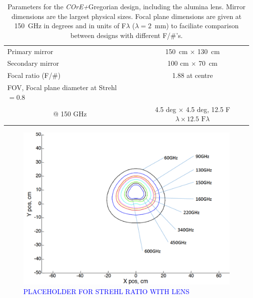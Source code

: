 \documentclass[11pt,a4paper]{article}
\newcommand{\comblue}[1]{\textcolor{blue}{#1}}
\newcommand{\coreplus}{\textit{\negthinspace COrE+\/}}
\begin{document}
\begin{table}[h!]
	\centering
	\begin{tabular}{|l|c|}
		\hline
		Primary mirror   & 150~cm $\times$ 130~cm   \\
		Secondary mirror   & 100 cm $\times$ 70~cm  \\
		Focal ratio (F/\#)               & 1.88 at centre   \\
		\multicolumn{1}{|l|}{FOV, Focal plane diameter at Strehl $= 0.8$} & \\
		\multicolumn{1}{|c|}{@ 150 GHz}    & 4.5 deg $\times$ 4.5 deg, 12.5 F$\lambda \times 12.5 \text{~F}\lambda$ \\
		\hline
		
	\end{tabular}
	\caption{Parameters for the \coreplus Gregorian design, including the alumina lens.  Mirror dimensions are the largest physical sizes.  Focal plane dimensions are given at 150~GHz in degrees and in units of F$\lambda$ ($\lambda=2$~mm) to faciliate comparison between 
		designs with different F/\#'s. }
	\label{tab:mirrors_greg}
	
\end{table}
\begin{figure}[htbp]
	\centering
	\includegraphics[scale=0.5]{core_nolens_strehl.png}
	\caption{\comblue{PLACEHOLDER FOR STREHL RATIO WITH LENS}}
	\label{fig:greg_lens_strehl}
\end{figure}
\end{document}
